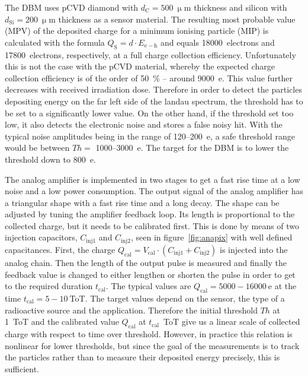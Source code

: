 The DBM uses pCVD diamond with $d_\mathrm{C}=500~\upmu$m thickness and silicon with $d_\mathrm{Si}=200~\upmu$m thickness as a sensor material. The resulting most probable value (MPV) of the deposited charge for a minimum ionising particle (MIP) is calculated with the formula $Q_\mathrm{S}=d \cdot E_\mathrm{e-h}$ and equals 18000~electrons and 17800~electrons, respectively, at a full charge collection efficiency. Unfortunately this is not the case with the pCVD material, whereby the expected charge collection efficiency is of the order of 50~\%  -- around 9000~e. This value further decreases with received irradiation dose. Therefore in order to detect the particles depositing energy on the far left side of the landau spectrum, the threshold has to be set to a significantly lower value. On the other hand, if the threshold set too low, it also detects the electronic noise and stores a false noisy hit. With the typical noise amplitudes being in the range of 120--200~e, a safe threshold range would be between $Th=$ 1000--3000~e. The target for the DBM is to lower the threshold down to 800~e.

The analog amplifier is implemented in two stages to get a fast rise time at a low noise and a low power consumption. The output signal of the analog amplifier has a triangular shape with a fast rise time and a long decay.  The shape can be adjusted by tuning the amplifier feedback loop. Its length is proportional to the collected charge, but it needs to be calibrated first. This is done by means of two injection capacitors, $C_\mathrm{inj1}$ and $C_\mathrm{inj2}$, seen in figure~\ref{fig:anapix} with well defined capacitances. First, the charge $Q_\mathrm{cal}=V_\mathrm{cal}\cdot(C_\mathrm{inj1}+C_\mathrm{inj2})$ is injected into the analog chain. Then the length of the output pulse is measured and finally the feedback value is changed to either lengthen or shorten the pulse in order to get to the required duration $t_\mathrm{cal}$. The typical values are $Q_\mathrm{cal}=5000-16000~$e at the time $t_\mathrm{cal}=5-10~$ToT. The target values depend on the sensor, the type of a radioactive source and the application. Therefore the initial threshold $Th$ at 1~ToT and the calibrated value $Q_\mathrm{cal}$ at $t_\mathrm{cal}$~ToT give us a linear scale of collected charge with respect to time over threshold.
However, in practice this relation is nonlinear for lower thresholds, but since the goal of the measurements is to track the particles rather than to measure their deposited energy precisely, this is sufficient. 


